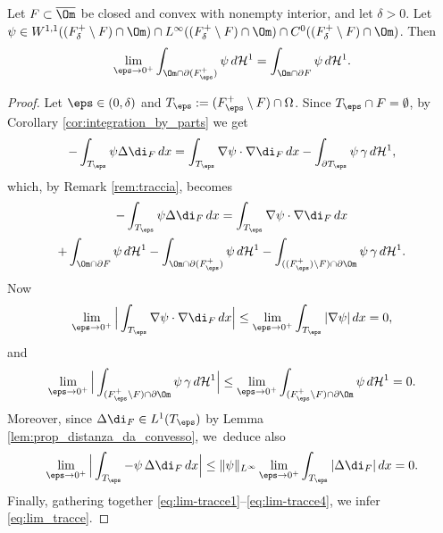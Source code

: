 \begin{lemma}\label{lem:limite_di_traccia}
Let $F\subset\overline\Om$ be closed and convex with nonempty interior,
and let $\delta>0$.
Let $\psi\in W^{1,1}((F^+_{\delta}\setminus F)\cap\Om)\cap L^\infty((F^+_{\delta}\setminus F)\cap\Om)\cap C^0((F^+_{\delta}\setminus F)\cap\Om)$. Then
\begin{equation}\label{eq:lim_tracce}
\lim_{\eps\to0^+} \int_{\Om\cap\partial(F^+_\eps)}\psi\,d\mathcal{H}^1=\int_{\Om\cap\partial F}\psi\,d\mathcal{H}^1.
\end{equation}
\end{lemma}

\begin{proof}
Let $\eps\in(0,\delta)$ and $T_\eps:=(F^+_\eps\setminus F)\cap \Omega$. Since $T_\eps\cap F=\emptyset$, by Corollary \ref{cor:integration_by_parts} we get
\begin{equation}\label{eq:lim_tracce*}
\begin{split}
-\int_{T_\eps}\psi\Delta\di_{F}\,dx
=
\int_{T_\eps} \nabla\psi\cdot\nabla\di_{F}\,dx- \int_{\partial T_\eps}\psi\,\gamma\,d\mathcal{H}^1,
\end{split}
\end{equation}
which, by Remark \ref{rem:traccia}, becomes
\begin{multline}\label{eq:lim-tracce1}
-\int_{T_\eps}\psi\Delta\di_{F}\,dx
= \int_{T_\eps} \nabla\psi\cdot\nabla\di_{F}\,dx\\
+ \int_{\Om\cap\partial F}\psi\,d\mathcal{H}^1
-\int_{\Om\cap\partial(F_\eps^+)}\psi\,d\mathcal{H}^1
-\int_{((F^+_\eps)\setminus F)\cap\partial \Om}\psi\,\gamma\,d\mathcal{H}^1.
\end{multline}
Now
\begin{equation}\label{eq:lim-tracce2}
\lim_{\eps\to0^+} \Big|\int_{T_\eps} \nabla\psi\cdot\nabla\di_{F}\,dx
\Big| \le\lim_{\eps\to0^+} \int_{T_\eps} |\nabla \psi|\,dx=0,
\end{equation}
and
\begin{equation}\label{eq:lim-tracce3}
\lim_{\eps\to0^+} \Big| \int_{(F^+_\eps\setminus F)\cap\partial\Om}\psi\,\gamma\,d\mathcal{H}^1\Big|\le
\lim_{\eps\to0^+} \int_{(F^+_\eps\setminus F)\cap\partial\Om}\psi\,d\mathcal{H}^1=0.
\end{equation}
Moreover, since $\Delta\di_{F}\in L^1(T_\eps)$ by Lemma \ref{lem:prop_distanza_da_convesso}, we~deduce also
\begin{equation}\label{eq:lim-tracce4}
\lim_{\eps\to0^+}\Big| \int_{T_\eps}-\psi\,\Delta\di_{F}\,dx\Big|\le \|\psi\|_{L^\infty}\lim_{\eps\to0^+} \int_{T_\eps}|\Delta \di_{F}|\,dx=0.
\end{equation}
Finally, gathering together \eqref{eq:lim-tracce1}--\eqref{eq:lim-tracce4}, we infer \eqref{eq:lim_tracce}.
\end{proof}
